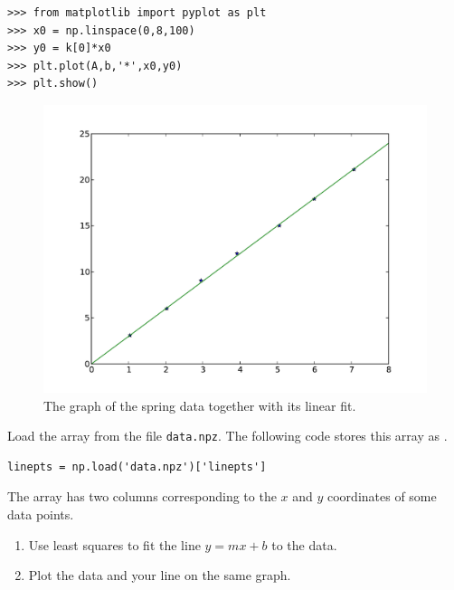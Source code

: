 \begin{lstlisting}
>>> from matplotlib import pyplot as plt
>>> x0 = np.linspace(0,8,100)
>>> y0 = k[0]*x0
>>> plt.plot(A,b,'*',x0,y0)
>>> plt.show()
\end{lstlisting}

\begin{figure}
\includegraphics[width=\textwidth]{line_lstsq}
\caption{The graph of the spring data together with its linear fit.}
\label{fig:spring_fit}
\end{figure}

\begin{problem}
Load the  array from the file \texttt{data.npz}. The following code stores this array as .
\begin{lstlisting}
linepts = np.load('data.npz')['linepts']
\end{lstlisting}
The  array has two columns corresponding to the $x$ and $y$ coordinates of some data points.
\begin{enumerate}
\item Use least squares to fit the line $y=mx+b$ to the data.
\item Plot the data and your line on the same graph.
\end{enumerate}
\end{problem}

